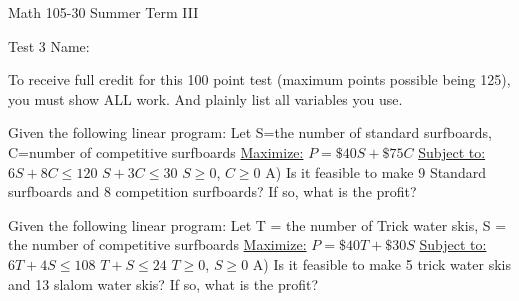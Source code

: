 \documentclass[11pt,epsfig]{article}
\begin{document}
Math 105-30 Summer Term III 

Test 3 \hspace{1.9in} {Name:} {\underline {\hspace{3.5in}}}
\vspace{1pc}

To receive full credit for this 100 point test (maximum points possible being 125), you must show ALL work. And plainly list all variables you use.
\vspace{0.5pc}






\begin{problem}{10}
Given the following linear program:
\newline
\newline
Let S=the number of standard surfboards, C=number of competitive surfboards
\newline
\underline{Maximize:}\hspace*{0.5cm} $P=\$40S+\$75C$
\newline
\underline{Subject to:}\hspace*{0.45cm}
$6S+8C\leq 120$ 
\newline
\hspace*{2.4cm}$S+3C\leq 30$
\newline
\hspace*{2.4cm}$S \geq 0$, $C\geq 0$
\newline
\newline
A) Is it feasible to make 9 Standard surfboards and 8 competition surfboards? If so, what is the profit?
\vfill
\end{problem}





\begin{problem}{10}
Given the following linear program:
\newline
\newline
Let T = the number of Trick water skis, S = the number of competitive surfboards
\newline
\underline{Maximize:}\hspace*{0.5cm}  $P=\$40T+\$30S$
\newline
\underline{Subject to:}\hspace*{0.45cm} $6T+4S\leq 108$ 
\newline
\hspace*{2.4cm}$T+S\leq 24$
\newline
\hspace*{2.4cm}$T \geq 0$, $S\geq 0$
\newline
\newline
A) Is it feasible to make 5 trick water skis and 13 slalom water skis? If so, what is the profit?
\vfill
\end{problem}
\end{document}
